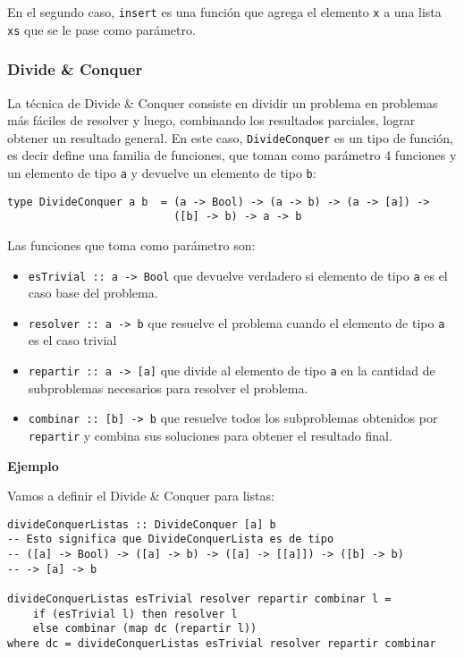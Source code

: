 En el segundo caso, \texttt{insert} es una función que agrega el elemento \texttt{x} a una lista \texttt{xs} que se le pase como parámetro.

\subsubsection{Divide \& Conquer}
La técnica de Divide \& Conquer consiste en dividir un problema en problemas más fáciles de resolver y luego, combinando los resultados parciales, lograr
obtener un resultado general. En este caso, \texttt{DivideConquer} es un tipo de función, es decir define una familia de funciones, que toman como parámetro 4 funciones y un elemento de tipo \texttt{a} y devuelve un elemento de tipo \texttt{b}:
\begin{centrado}
	\begin{verbatim}
type DivideConquer a b  = (a -> Bool) -> (a -> b) -> (a -> [a]) -> 
                          ([b] -> b) -> a -> b                         
\end{verbatim}
\end{centrado}
Las funciones que toma como parámetro son:
\begin{itemize}
	\item \texttt{esTrivial :: a -> Bool} que devuelve verdadero si elemento de tipo \texttt{a} es el caso base del problema.
	\item \texttt{resolver :: a -> b} que resuelve el problema cuando el elemento de tipo \texttt{a} es el caso trivial
	\item \texttt{repartir :: a -> [a]} que divide al elemento de tipo \texttt{a} en la cantidad de subproblemas necesarios para resolver el problema.
	\item \texttt{combinar :: [b] -> b} que resuelve todos los subproblemas obtenidos por \texttt{repartir} y combina sus soluciones para obtener el resultado final.
\end{itemize}

\textbf{Ejemplo}

Vamos a definir el Divide \& Conquer para listas:
\begin{centrado}
	\begin{verbatim}
divideConquerListas :: DivideConquer [a] b
-- Esto significa que DivideConquerLista es de tipo 
-- ([a] -> Bool) -> ([a] -> b) -> ([a] -> [[a]]) -> ([b] -> b)
-- -> [a] -> b

divideConquerListas esTrivial resolver repartir combinar l =
	if (esTrivial l) then resolver l
	else combinar (map dc (repartir l))
where dc = divideConquerListas esTrivial resolver repartir combinar
                        
	\end{verbatim}
\end{centrado}


